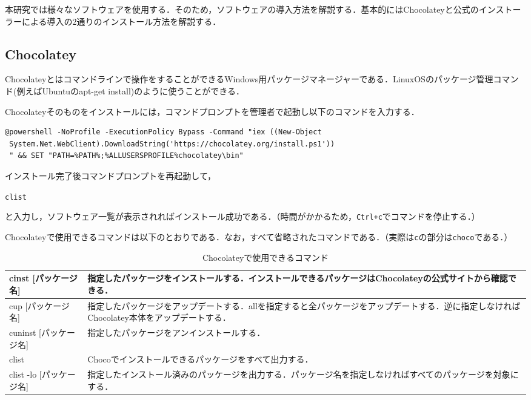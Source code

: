 本研究では様々なソフトウェアを使用する．そのため，ソフトウェアの導入方法を解説する．基本的にはChocolateyと公式のインストーラーによる導入の2通りのインストール方法を解説する．

\subsection{Chocolatey}

Chocolatey\cite{choco}とはコマンドラインで操作をすることができるWindows用パッケージマネージャーである．LinuxOSのパッケージ管理コマンド(例えばUbuntuのapt-get install)のように使うことができる．

Chocolateyそのものをインストールには，コマンドプロンプトを管理者で起動し以下のコマンドを入力する．\\

\begin{verbatim}
@powershell -NoProfile -ExecutionPolicy Bypass -Command "iex ((New-Object
 System.Net.WebClient).DownloadString('https://chocolatey.org/install.ps1'))
 " && SET "PATH=%PATH%;%ALLUSERSPROFILE%chocolatey\bin"
\end{verbatim}

インストール完了後コマンドプロンプトを再起動して，

\texttt{clist}

と入力し，ソフトウェア一覧が表示されればインストール成功である．（時間がかかるため，\texttt{Ctrl+c}でコマンドを停止する．）

Chocolateyで使用できるコマンドは以下のとおりである．なお，すべて省略されたコマンドである．（実際は\texttt{c}の部分は\texttt{choco}である．）

\begin{table}[htb]
   \caption{Chocolateyで使用できるコマンド}
  \begin{tabular}{|p{3cm}|p{9.5cm}|} \hline 
    cinst [パッケージ名] & 指定したパッケージをインストールする．インストールできるパッケージはChocolateyの公式サイトから確認できる． \\ \hline \hline
   cup [パッケージ名] & 指定したパッケージをアップデートする．allを指定すると全パッケージをアップデートする．逆に指定しなければChocolatey本体をアップデートする． \\ \hline
    cuninst [パッケージ名] & 指定したパッケージをアンインストールする．   \\ \hline
    clist & Chocoでインストールできるパッケージをすべて出力する． \\ \hline
    clist -lo [パッケージ名] & 指定したインストール済みのパッケージを出力する．パッケージ名を指定しなければすべてのパッケージを対象にする． \\ \hline
  \end{tabular}
\end{table}

